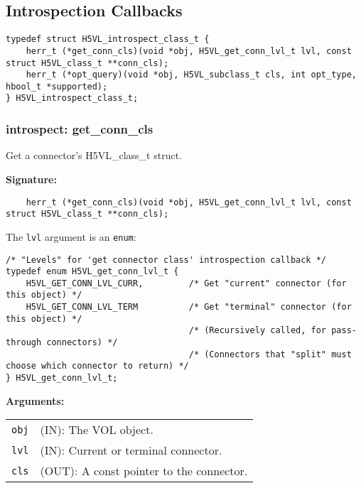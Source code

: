 \subsection{Introspection Callbacks}

\begin{lstlisting}[caption={Structure for VOL connector introspection callback routines, H5VLconnector.h}, captionpos=b, label={lst:Introspectclass}]
typedef struct H5VL_introspect_class_t {                                            
    herr_t (*get_conn_cls)(void *obj, H5VL_get_conn_lvl_t lvl, const struct H5VL_class_t **conn_cls);
    herr_t (*opt_query)(void *obj, H5VL_subclass_t cls, int opt_type, hbool_t *supported);
} H5VL_introspect_class_t;
\end{lstlisting}

\subsubsection{introspect: get\_conn\_cls}
Get a connector's H5VL\_class\_t struct.

\begin{mdframed}[style=bgbox]
\textbf{Signature:}
\begin{lstlisting}
    herr_t (*get_conn_cls)(void *obj, H5VL_get_conn_lvl_t lvl, const struct H5VL_class_t **conn_cls);
\end{lstlisting}

The \texttt{lvl} argument is an \texttt{enum}:
\begin{lstlisting}
/* "Levels" for 'get connector class' introspection callback */                  
typedef enum H5VL_get_conn_lvl_t {
    H5VL_GET_CONN_LVL_CURR,         /* Get "current" connector (for this object) */
    H5VL_GET_CONN_LVL_TERM          /* Get "terminal" connector (for this object) */
                                    /* (Recursively called, for pass-through connectors) */
                                    /* (Connectors that "split" must choose which connector to return) */
} H5VL_get_conn_lvl_t;
\end{lstlisting}

\textbf{Arguments:}\\
\begin{tabular}{l p{13.5cm}}
  \texttt{obj} & (IN): The VOL object.\\
  \texttt{lvl} & (IN): Current or terminal connector.\\
  \texttt{cls} & (OUT): A const pointer to the connector.\\
\end{tabular}
\end{mdframed}

